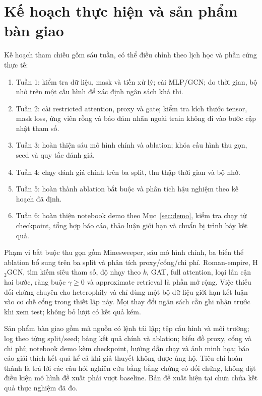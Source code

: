 \documentclass[12pt,a4paper]{article}
\numberwithin{equation}{section}
\theoremstyle{definition}
\begin{document}
\section{Kế hoạch thực hiện và sản phẩm bàn giao}
Kế hoạch tham chiếu gồm sáu tuần, có thể điều chỉnh theo lịch học và phần cứng thực tế:
\begin{enumerate}
    \item Tuần 1: kiểm tra dữ liệu, mask và tiền xử lý; cài MLP/GCN; đo thời gian, bộ nhớ trên một cấu hình để xác định ngân sách khả thi.
    \item Tuần 2: cài restricted attention, proxy và gate; kiểm tra kích thước tensor, mask loss, ứng viên rỗng và bảo đảm nhãn ngoài train không đi vào bước cập nhật tham số.
    \item Tuần 3: hoàn thiện sáu mô hình chính và ablation; khóa cấu hình thu gọn, seed và quy tắc đánh giá.
    \item Tuần 4: chạy đánh giá chính trên ba split, thu thập thời gian và bộ nhớ.
    \item Tuần 5: hoàn thành ablation bắt buộc và phân tích hậu nghiệm theo kế hoạch đã định.
    \item Tuần 6: hoàn thiện notebook demo theo Mục~\ref{sec:demo}, kiểm tra chạy từ checkpoint, tổng hợp báo cáo, thảo luận giới hạn và chuẩn bị trình bày kết quả.
\end{enumerate}

Phạm vi bắt buộc thu gọn gồm Minesweeper, sáu mô hình chính, ba biến thể ablation bổ sung trên ba split và phân tích proxy/cổng/chi phí. Roman-empire, H$_2$GCN, tìm kiếm siêu tham số, độ nhạy theo $k$, GAT, full attention, loại lân cận hai bước, ràng buộc $\gamma\geq0$ và approximate retrieval là phần mở rộng. Việc thiếu đối chứng chuyên cho heterophily và chỉ dùng một bộ dữ liệu giới hạn kết luận vào cơ chế cổng trong thiết lập này. Mọi thay đổi ngân sách cần ghi nhận trước khi xem test; không bỏ lượt có kết quả kém.

Sản phẩm bàn giao gồm mã nguồn có lệnh tái lập; tệp cấu hình và môi trường; log theo từng split/seed; bảng kết quả chính và ablation; biểu đồ proxy, cổng và chi phí; notebook demo kèm checkpoint, hướng dẫn chạy và ảnh minh họa; báo cáo giải thích kết quả kể cả khi giả thuyết không được ủng hộ. Tiêu chí hoàn thành là trả lời các câu hỏi nghiên cứu bằng bằng chứng có đối chứng, không đặt điều kiện mô hình đề xuất phải vượt baseline. Bản đề xuất hiện tại chưa chứa kết quả thực nghiệm đã đo.

\clearpage
\end{document}
